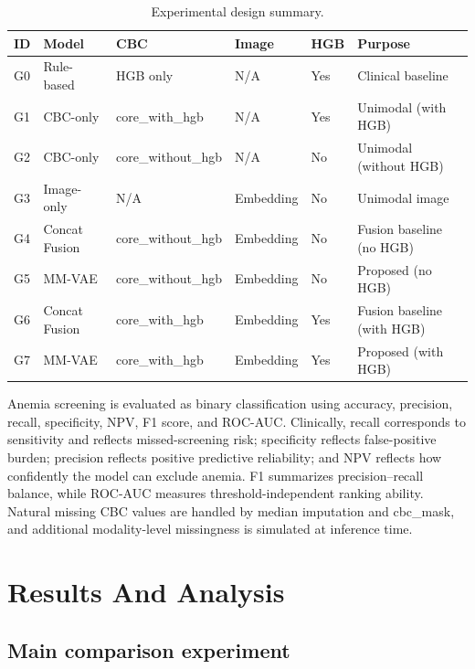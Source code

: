 \documentclass[conference,letterpaper]{IEEEtran}
\begin{document}
\begin{table}[t]
\caption{Experimental design summary.}
\label{tab:experiment-design}
\centering
\small
\begin{tabular}{p{}p{}p{}p{}p{}p{}}
\hline
\textbf{ID} & \textbf{Model} & \textbf{CBC} & \textbf{Image} & \textbf{HGB} & \textbf{Purpose} \\
\hline
G0 & Rule-based & HGB only & N/A & Yes & Clinical baseline \\
G1 & CBC-only & core\_with\_hgb & N/A & Yes & Unimodal (with HGB) \\
G2 & CBC-only & core\_without\_hgb & N/A & No & Unimodal (without HGB) \\
G3 & Image-only & N/A & Embedding & No & Unimodal image \\
G4 & Concat Fusion & core\_without\_hgb & Embedding & No & Fusion baseline (no HGB) \\
G5 & MM-VAE & core\_without\_hgb & Embedding & No & Proposed (no HGB) \\
G6 & Concat Fusion & core\_with\_hgb & Embedding & Yes & Fusion baseline (with HGB) \\
G7 & MM-VAE & core\_with\_hgb & Embedding & Yes & Proposed (with HGB) \\
\hline
\end{tabular}
\end{table}

Anemia screening is evaluated as binary classification using accuracy, precision, recall, specificity, NPV, F1 score, and ROC-AUC. Clinically, recall corresponds to sensitivity and reflects missed-screening risk; specificity reflects false-positive burden; precision reflects positive predictive reliability; and NPV reflects how confidently the model can exclude anemia. F1 summarizes precision--recall balance, while ROC-AUC measures threshold-independent ranking ability. Natural missing CBC values are handled by median imputation and cbc\_mask, and additional modality-level missingness is simulated at inference time.

\section{Results And Analysis}

\subsection{Main comparison experiment}
\end{document}
